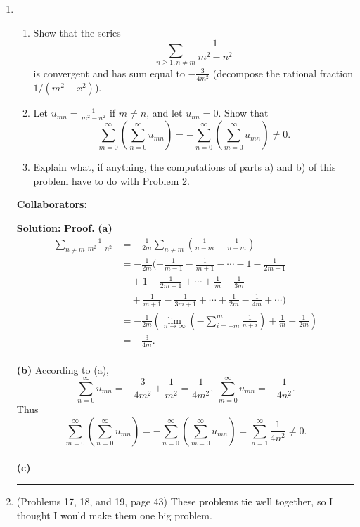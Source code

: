 \documentclass{article}%
\newenvironment{proof}[1][Proof]{\textbf{#1.} }{\ \rule{0.5em}{0.5em}}
\begin{document}
\begin{enumerate}
\item \begin{enumerate}
\item Show that the series \[
\sum_{n\geq 1, n\neq m} \frac{1}{m^2 - n^2}\]is convergent and has sum equal to $-\frac{3}{4m^2}$ (decompose the rational fraction $1/(m^2 - x^2)$).
\item Let $u_{mn} = \frac{1}{m^2 - n^2}$ if $m\neq n$, and let $u_{nn} = 0$. Show that \[
\sum_{m=0}^{\infty}\left(\sum_{n=0}^{\infty} u_{mn}\right) = -\sum_{n=0}^{\infty}\left(\sum_{m=0}^{\infty} u_{mn}\right) \neq 0.\]
\item Explain what, if anything, the computations of parts a) and b) of this problem have to do with Problem 2.
\end{enumerate}


\bigskip
\textbf{Collaborators:}\\
\smallskip
 
\textbf{Solution:}
\begin{proof}
\textbf{(a)} \\[2pt]
$$
\begin{aligned}
\sum_{n\ne m}\frac{1}{m^2-n^2} &= -\frac{1}{2m}\sum_{n\ne m}\left(\frac{1}{n-m}-\frac{1}{n+m} \right)\\
&=-\frac{1}{2m}(-\frac{1}{m-1}-\frac{1}{m+1}-\cdots-1-\frac{1}{2m-1}\\
&\quad + 1-\frac{1}{2m+1}+\cdots+\frac{1}{m}-\frac{1}{3m}\\
&\quad + \frac{1}{m+1}-\frac{1}{3m+1}+\cdots+\frac{1}{2m}-\frac{1}{4m}+\cdots) \\
&= -\frac{1}{2m}\left(\lim_{n\to\infty}(-\sum_{i=-m}^{m}\frac{1}{n+i}) + \frac{1}{m} + \frac{1}{2m}\right) \\
&= -\frac{3}{4m}.
\end{aligned}
$$
\\
\textbf{(b)} 
According to (a),
$$
\sum_{n=0}^{\infty}u_{mn} = -\frac{3}{4m^2}+\frac{1}{m^2} = \frac{1}{4m^2}, ~\sum_{m=0}^{\infty}u_{mn} = -\frac{1}{4n^2}.
$$
Thus
$$
\sum_{m=0}^{\infty}\left(\sum_{n=0}^{\infty} u_{mn}\right) = -\sum_{n=0}^{\infty}\left(\sum_{m=0}^{\infty} u_{mn}\right) = \sum_{n=1}^{\infty}\frac{1}{4n^2}\ne 0.
$$
\\
\textbf{(c)}
\end{proof}
\bigskip



\item (Problems 17, 18, and 19, page 43) These problems tie well together, so I thought I would make them one big problem.


\end{enumerate}
\end{document}
